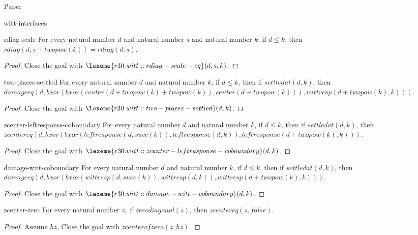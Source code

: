 \begin{lexlean}{Paper}
\begin{section}{witt-interfaces}
  \begin{theorem}{rdiag-scale}
  For every natural number \(d\) and natural number \(s\) and natural number \(k\), if \(d ≤ k\), then \(rdiag(d, s + twopow(k)) = rdiag(d, s)\).
  \begin{proof}
  Close the goal with \(\lexeme{r30.witt::rdiag-scale-eq}(d, s, k)\).
  \end{proof}
  \end{theorem}

  \begin{theorem}{two-places-settled}
  For every natural number \(d\) and natural number \(k\), if \(d ≤ k\), then if \(settledat(d, k)\), then \(damageeq(d, bxor(bxor(center(d + twopow(k) + twopow(k)), center(d + twopow(k))), wittresp(d + twopow(k), k)))\).
  \begin{proof}
  Close the goal with \(\lexeme{r30.witt::two-places-settled}(d, k)\).
  \end{proof}
  \end{theorem}

  \begin{theorem}{zcenter-leftresponse-coboundary}
  For every natural number \(d\) and natural number \(k\), if \(d ≤ k\), then if \(settledat(d, k)\), then \(zcentereq(d, bxor(bxor(leftresponse(d, succ(k)), leftresponse(d, k)), leftresponse(d + twopow(k), k)))\).
  \begin{proof}
  Close the goal with \(\lexeme{r30.witt::zcenter-leftresponse-coboundary}(d, k)\).
  \end{proof}
  \end{theorem}

  \begin{theorem}{damage-witt-coboundary}
  For every natural number \(d\) and natural number \(k\), if \(d ≤ k\), then if \(settledat(d, k)\), then \(damageeq(d, bxor(bxor(wittresp(d, succ(k)), wittresp(d, k)), wittresp(d + twopow(k), k)))\).
  \begin{proof}
  Close the goal with \(\lexeme{r30.witt::damage-witt-coboundary}(d, k)\).
  \end{proof}
  \end{theorem}

  \begin{theorem}{zcenter-zero}
  For every natural number \(z\), if \(zerodiagonal(z)\), then \(zcentereq(z, false)\).
  \begin{proof}
  Assume \(hz\).
  Close the goal with \(zcenterofzero(z, hz)\).
  \end{proof}
  \end{theorem}


\end{section}
\end{lexlean}

